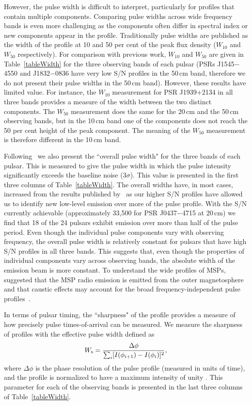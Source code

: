 \documentclass[useAMS,usenatbib]{mn2e}
\begin{document}
However, the pulse width is difficult to interpret, particularly for profiles 
that contain multiple components. Comparing pulse widths across wide frequency 
bands is even more challenging as the components often differ in spectral index or new 
components appear in the profile. Traditionally pulse widths are published as the 
width of the profile at 10 and 50 per cent of the peak flux density ($W_{10}$ and $W_{50}$ 
respectively).  
%
For comparison with previous work, $W_{10}$ and $W_{50}$ are given in Table~\ref{tableWidth} 
for the three observing bands of each pulsar (PSRs J1545$-$4550 and J1832$-$0836 
have very low S/N profiles in the 50\,cm band, therefore we do not present their 
pulse widths in the 50\,cm band). 
%
However, these results have limited value. For instance, the $W_{10}$ measurement for 
PSR J1939$+$2134 in all three bands provides a measure of the width between the 
two distinct components. The $W_{50}$ measurement does the same for the 20\,cm and the 
50\,cm observing bands, but in the 10\,cm band one of the components does not reach 
the 50 per cent height of the peak component. The meaning of the $W_{50}$ measurement 
is therefore different in the 10\,cm band. 
%

Following~\citet{Yan11} we also present the ``overall pulse width" for the three 
bands of each pulsar. This is measured to give the pulse width in which the pulse 
intensity significantly exceeds the baseline noise (3$\sigma$). This value is presented 
in the first three columns of Table~\ref{tableWidth}.   
%
The overall widths have, in most cases, increased from the results published by~\citet{Yan11} 
as our higher S/N profiles have allowed us to identify new low-level emission over 
more of the pulse profile. With the S/N currently achievable (approximately 33,500 for 
PSR J0437$-$4715 at 20\,cm) we find that 18 of the 24 pulsars exhibit emission 
over more than half of the pulse period. 
%
Even though the individual pulse components vary with observing frequency, the 
overall pulse width is relatively constant for pulsars that have high S/N profiles in all 
three bands. This suggests that, even though the properties of individual components 
vary across observing bands, the absolute width of the emission beam is more constant.
%
To understand the wide profiles of MSPs, \citet{Ravi10} suggested that the MSP radio 
emission is emitted from the outer magnetosphere and that caustic effects may account 
for the broad frequency-independent pulse profiles~\citep{Dyks03,Watters09}.
%

In terms of pulsar timing, the ``sharpness" of the profile provides a measure of 
how precisely pulse times-of-arrival can be measured. We measure the sharpness of 
profiles with the effective pulse width defined as 
%
\begin{equation}
W_{\rm{s}}=\frac{\Delta \phi}{\sum_{i}[I(\phi_{i+1})-I(\phi_{i})]^2},
\end{equation}
%
where $\Delta \phi$ is the phase resolution of the pulse profile (measured in units 
of time), and the profile is normalized to have a maximum intensity of unity \citep{Cordes10,Shannon14}.
%
This parameter for each of the observing bands is presented in the last three columns 
of Table~\ref{tableWidth}.  
\end{document}
